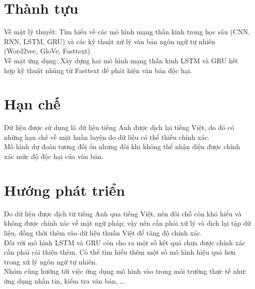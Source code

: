 \section*{Thành tựu}
Về mặt lý thuyết: Tìm hiểu về các mô hình mạng thần kinh trong học sâu (CNN, RNN, LSTM, GRU) và các kỹ thuật xử lý văn bản ngôn ngữ tự nhiên (Word2vec, GloVe, Fasttext).\\
Về mặt ứng dụng: Xây dựng hai mô hình mạng thần kinh LSTM và GRU kết hợp kỹ thuật nhúng từ Fasttext để phát hiện văn bản độc hại.

\section*{Hạn chế}
Dữ liệu được sử dụng là dữ liệu tiếng Anh được dịch lại tiếng Việt, do đó có những hạn chế về mặt huấn luyện do dữ liệu có thể thiếu chính xác.\\
Mô hình dự đoán tương đối ổn nhưng đôi khi không thể nhận diện được chính xác mức độ độc hại của văn bản.

\section*{Hướng phát triển}
Do dữ liệu được dịch từ tiếng Anh qua tiếng Việt, nên đôi chỗ còn khó hiểu và không được chính xác về mặt ngữ pháp; vậy nên cần phải xử lý và dịch lại tập dữ liệu, đồng thời thêm vào dữ liệu thuần Việt để tăng độ chính xác.\\
Đối với mô hình LSTM và GRU còn cho ra một số kết quả chưa được chính xác cần phải cải thiện thêm. Có thể tìm hiểu thêm một số mô hình hiệu quả hơn trong xử lý ngôn ngữ tự nhiên.\\
Nhóm cũng hướng tới việc ứng dụng mô hình vào trong môi trường thực tế như: ứng dụng nhắn tin, kiểm tra văn bản, \dots